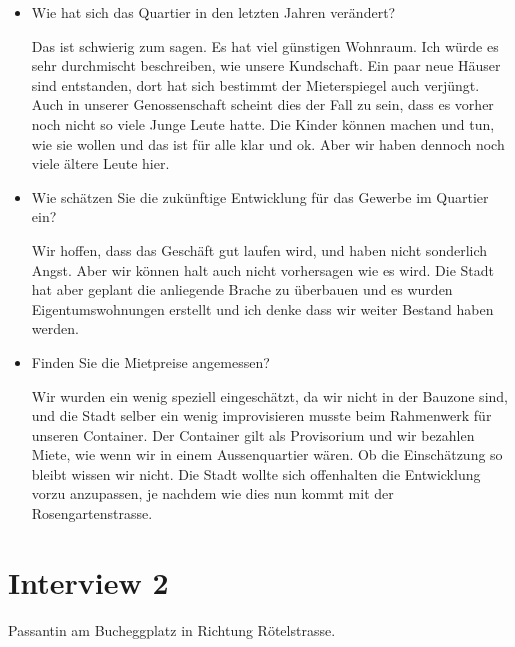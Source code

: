 \documentclass[a4paper,ngerman,11pt]{scrartcl}
\begin{document}
\begin{itemize}
\item Wie hat sich das Quartier in den letzten Jahren verändert?

Das ist schwierig zum sagen. Es hat viel günstigen Wohnraum. Ich würde es
sehr durchmischt beschreiben, wie unsere Kundschaft. Ein paar neue Häuser
sind entstanden, dort hat sich bestimmt der Mieterspiegel auch
verjüngt. Auch in unserer Genossenschaft scheint dies der Fall zu sein, dass
es vorher noch nicht so viele Junge Leute hatte. Die Kinder können machen
und tun, wie sie wollen und das ist für alle klar und ok. Aber wir haben
dennoch noch viele ältere Leute hier.

\item Wie schätzen Sie die zukünftige Entwicklung für das Gewerbe im Quartier ein?

Wir hoffen, dass das Geschäft gut laufen wird, und haben nicht sonderlich
Angst. Aber wir können halt auch nicht vorhersagen wie es wird. Die Stadt
hat aber geplant die anliegende Brache zu überbauen und es wurden
Eigentumswohnungen erstellt und ich denke dass wir weiter Bestand haben
werden.

\item Finden Sie die Mietpreise angemessen?

Wir wurden ein wenig speziell eingeschätzt, da wir nicht in der Bauzone
sind, und die Stadt selber ein wenig improvisieren musste beim Rahmenwerk
für unseren Container. Der Container gilt als Provisorium und wir bezahlen
Miete, wie wenn wir in einem Aussenquartier wären. Ob die Einschätzung so
bleibt wissen wir nicht. Die Stadt wollte sich offenhalten die Entwicklung
vorzu anzupassen, je nachdem wie dies nun kommt mit der Rosengartenstrasse.
\end{itemize}


\section*{Interview 2}
\label{sec-4}

Passantin am Bucheggplatz in Richtung Rötelstrasse.
\end{document}
